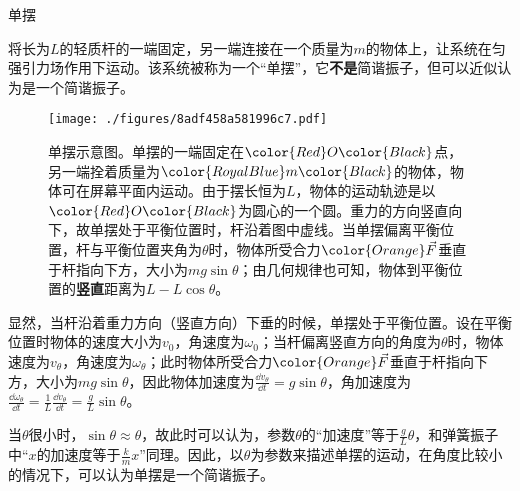 \begin{example}{单摆}


将长为$L$的轻质杆的一端固定，另一端连接在一个质量为$m$的物体上，让系统在匀强引力场作用下运动。该系统被称为一个“单摆”，它\textbf{不是}简谐振子，但可以近似认为是一个简谐振子。


\begin{figure}[ht]
\centering
\texttt{[image: ./figures/8adf458a581996c7.pdf]}
\caption{单摆示意图。单摆的一端固定在$\color{Red}O\color{Black}$点，另一端拴着质量为$\color{RoyalBlue}m\color{Black}$的物体，物体可在屏幕平面内运动。由于摆长恒为$L$，物体的运动轨迹是以$\color{Red}O\color{Black}$为圆心的一个圆。重力的方向竖直向下，故单摆处于平衡位置时，杆沿着图中虚线。当单摆偏离平衡位置，杆与平衡位置夹角为$\theta$时，物体所受合力$\color{Orange}\vec{F}$垂直于杆指向下方，大小为$mg\sin\theta$；由几何规律也可知，物体到平衡位置的\textbf{竖直}距离为$L-L\cos\theta$。} \label{fig_SHOhs_1}
\end{figure}


显然，当杆沿着重力方向（竖直方向）下垂的时候，单摆处于平衡位置。设在平衡位置时物体的速度大小为$v_0$，角速度为$\omega_0$；当杆偏离竖直方向的角度为$\theta$时，物体速度为$v_\theta$，角速度为$\omega_\theta$；此时物体所受合力$\color{Orange}\vec{F}$垂直于杆指向下方，大小为$mg\sin\theta$，因此物体加速度为$\frac{\dd v_\theta}{\dd t}=g\sin\theta$，角加速度为$\frac{\dd \omega_\theta}{\dd t}=\frac{1}{L}\frac{\dd v_\theta}{\dd t}=\frac{g}{L}\sin\theta$。

当$\theta$很小时，$\sin\theta\approx\theta$，故此时可以认为，参数$\theta$的“加速度”等于$\frac{g}{L}\theta$，和弹簧振子中“$x$的加速度等于$\frac{k}{m}x$”同理。因此，以$\theta$为参数来描述单摆的运动，在角度比较小的情况下，可以认为单摆是一个简谐振子。

\end{example}


